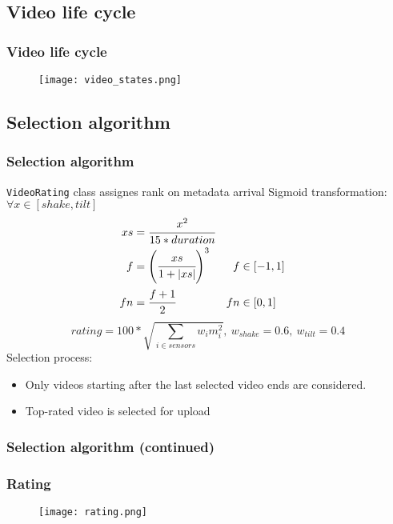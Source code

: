 \subsection{Video life cycle}
\begin{frame}[fragile]	
	\frametitle{Video life cycle}
	\begin{figure}[!t]
		\centering
		\texttt{[image: video\_states.png]}
		\label{fig:states}
	\end{figure}
\end{frame}

\subsection{Selection algorithm}
\begin{frame}	
	\frametitle{Selection algorithm}
	\texttt{VideoRating} class assignes rank on metadata arrival
	Sigmoid transformation: $\forall x \in [shake, tilt]$
	\begin{align*}
		xs &= \cfrac{x^2}{15 * duration} \\
		f  &= \left(\cfrac{xs}{1+|xs|}\right)^3 &f  &\in [-1, 1] \\
		fn &= \cfrac{f + 1}{2}                  &fn &\in [0, 1]
	\end{align*}
	$$rating = 100 * \sqrt{ \sum\limits_{i \in sensors}{w_i m_i^2} },\ w_{shake} = 0.6,\ w_{tilt} = 0.4$$
	Selection process:
	\begin{itemize}
		\item Only videos starting after the last selected video ends are considered.
		\item Top-rated video is selected for upload
	\end{itemize}
\end{frame}

\begin{frame}	
	\frametitle{Selection algorithm (continued)}
	\begin{figure}[!t]
		\centering
		\hfill
	\end{figure}
\end{frame}

\begin{frame}	
	\frametitle{Rating}
	\begin{figure}[!t]
		\centering
		\texttt{[image: rating.png]}
		\label{fig:rating}
	\end{figure}
\end{frame}